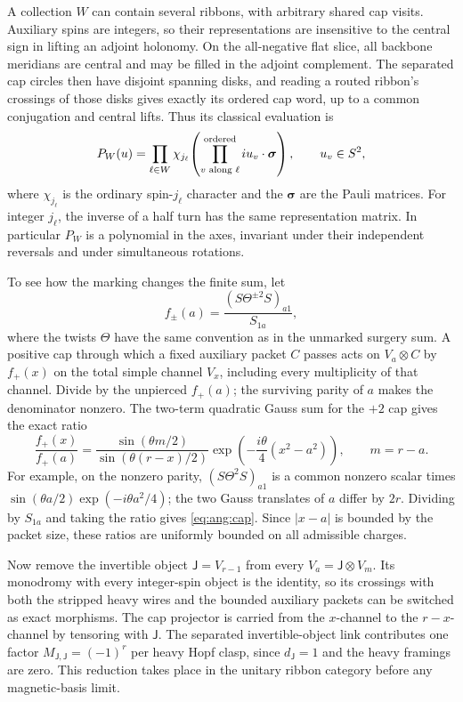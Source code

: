 A collection \(W\) can contain several ribbons, with arbitrary shared cap visits. Auxiliary spins are integers, so their representations are insensitive to the central sign in lifting an adjoint holonomy. On the all-negative flat slice, all backbone meridians are central and may be filled in the adjoint complement. The separated cap circles then have disjoint spanning disks, and reading a routed ribbon's crossings of those disks gives exactly its ordered cap word, up to a common conjugation and central lifts. Thus its classical evaluation is
\begin{equation}
 \label{eq:ang:word}
 P_W(u)=\prod_{\ell\in W}
   \chi_{j_\ell}\!\left(\prod_{v\text{ along }\ell}^{\rm ordered}
                                   i u_v\cdot\boldsymbol{\sigma}\right),
          \qquad u_v\in S^2 ,
\end{equation}
where \(\chi_{j_\ell}\) is the ordinary spin-\(j_\ell\) character and the \(\boldsymbol{\sigma}\) are the Pauli matrices. For integer \(j_\ell\), the inverse of a half turn has the same representation matrix. In particular \(P_W\) is a polynomial in the axes, invariant under their independent reversals and under simultaneous rotations.

To see how the marking changes the finite sum, let
\[
 f_\pm(a)=\frac{(S\Theta^{\pm2}S)_{a1}}{S_{1a}},
\]
where the twists \(\Theta\) have the same convention as in the unmarked surgery sum. A positive cap through which a fixed auxiliary packet \(C\) passes acts on \(V_a\otimes C\) by \(f_+(x)\) on the total simple channel \(V_x\), including every multiplicity of that channel. Divide by the unpierced \(f_+(a)\); the surviving parity of \(a\) makes the denominator nonzero. The two-term quadratic Gauss sum for the \(+2\) cap gives the exact ratio
\begin{equation}
 \label{eq:ang:cap}
 \frac{f_+(x)}{f_+(a)}
  =\frac{\sin(\theta m/2)}{\sin(\theta(r-x)/2)}
          \exp\!\left(-\frac{i\theta}{4}(x^2-a^2)\right),
                     \qquad m=r-a .
\end{equation}
For example, on the nonzero parity, \((S\Theta^2S)_{a1}\) is a common nonzero scalar times \(\sin(\theta a/2)\exp(-i\theta a^2/4)\); the two Gauss translates of \(a\) differ by \(2r\). Dividing by \(S_{1a}\) and taking the ratio gives \eqref{eq:ang:cap}. Since \(|x-a|\) is bounded by the packet size, these ratios are uniformly bounded on all admissible charges.

Now remove the invertible object \(\mathsf J=V_{r-1}\) from every \(V_a=\mathsf J\otimes V_m\). Its monodromy with every integer-spin object is the identity, so its crossings with both the stripped heavy wires and the bounded auxiliary packets can be switched as exact morphisms. The cap projector is carried from the \(x\)-channel to the \(r-x\)-channel by tensoring with \(\mathsf J\). The separated invertible-object link contributes one factor \(M_{\mathsf J,\mathsf J}=(-1)^r\) per heavy Hopf clasp, since \(d_{\mathsf J}=1\) and the heavy framings are zero. This reduction takes place in the unitary ribbon category before any magnetic-basis limit.

